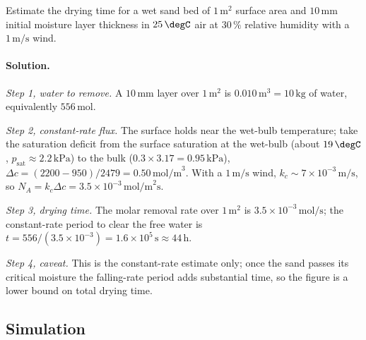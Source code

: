 \begin{exercise}
Estimate the drying time for a wet sand bed of $1\,\text{m}^2$ surface
area and $10\,\si{\milli\meter}$ initial moisture layer thickness in
$25\,\degC$ air at $30\,\%$ relative humidity with a $1\,\text{m/s}$
wind.

\paragraph{Solution.}
\textit{Step 1, water to remove.} A $10\,\si{\milli\meter}$ layer over
$1\,\text{m}^2$ is $0.010\,\text{m}^3 = 10\,\text{kg}$ of water,
equivalently $556\,\text{mol}$.

\textit{Step 2, constant-rate flux.} The surface holds near the
wet-bulb temperature; take the saturation deficit from the surface
saturation at the wet-bulb (about $19\,\degC$, $p_{\text{sat}}\approx
2.2\,\text{kPa}$) to the bulk ($0.3\times 3.17 = 0.95\,\text{kPa}$),
$\Delta c = (2200-950)/2479 = 0.50\,\text{mol/m}^3$. With a
$1\,\text{m/s}$ wind, $k_c \sim 7\times 10^{-3}\,\text{m/s}$, so
$N_A = k_c\Delta c = 3.5\times 10^{-3}\,\text{mol/m}^2\text{s}$.

\textit{Step 3, drying time.} The molar removal rate over $1\,\text{m}^2$
is $3.5\times 10^{-3}\,\text{mol/s}$; the constant-rate period to clear
the free water is $t = 556/(3.5\times 10^{-3}) = 1.6\times 10^{5}
\,\text{s} \approx 44\,\text{h}$.

\textit{Step 4, caveat.} This is the constant-rate estimate only; once
the sand passes its critical moisture the falling-rate period adds
substantial time, so the figure is a lower bound on total drying time.
\end{exercise}

\subsection*{Simulation}

